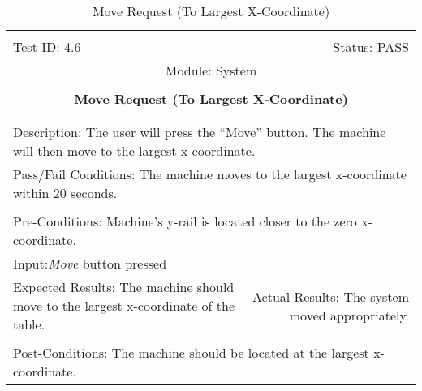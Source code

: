 \documentclass[titlepage]{article}
\begin{document}
\begin{center}
\begin{table}[h!]
\begin{tabular}{|l r|}\hline&\\[-2mm]
	Test ID: 4.6	&Status: PASS\\[-3mm]
	\multicolumn{2}{|c|}{Module: System}\\&\\
	\multicolumn{2}{|c|}{\textbf{\large{Move Request (To Largest X-Coordinate)}}}\\&\\\hline&\\[-3mm]
	\multicolumn{2}{|p{\textwidth}|}{Description: The user will press the ``Move'' button. The machine will then move to the largest x-coordinate.}\\\hline
	\multicolumn{2}{|p{\textwidth}|}{Pass/Fail Conditions: The machine moves to the largest x-coordinate within 20 seconds.}\\[1mm]\hline&\\[-3mm]
	\multicolumn{2}{|p{\textwidth}|}{Pre-Conditions: Machine's y-rail is located closer to the zero x-coordinate.}\\[4mm]
	\multicolumn{2}{|p{\textwidth}|}{Input:\newline\textit{Move} button pressed}\\[2mm]\hline
	\multicolumn{1}{|p{0.49\textwidth}}{Expected Results: The machine should move to the largest x-coordinate of the table.}	&\multicolumn{1}{|p{0.45\textwidth}|}{Actual Results: The system moved appropriately.}\\\hline&\\[-3mm]
	\multicolumn{2}{|p{\textwidth}|}{Post-Conditions: The machine should be located at the largest x-coordinate.}\\\hline
\end{tabular}
\caption{Move Request (To Largest X-Coordinate)}
\end{table}
\end{center}
\newpage
\end{document}
